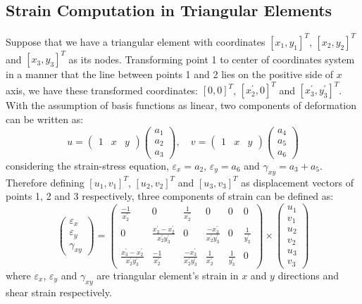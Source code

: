 \documentclass{jicspack}
\begin{document}
\subsection{Strain Computation in Triangular Elements}
Suppose that we have a triangular element with coordinates $[x_1, y_1]^T$, $[x_2, y_2]^T$ and $[x_3, y_3]^T$ as its nodes. Transforming point 1 to center of coordinates system in a manner that the line between points 1 and 2 lies on the positive side of $x$ axis, we have these transformed coordinates: $[0,0]^T$, $[x_2^{'}, 0]^T$ and $[x_3^{'}, y_3^{'}]^T$. With the assumption of basis functions as linear, two components of deformation can be written as:
\begin{equation}
u=\begin{pmatrix}
1 & x & y
\end{pmatrix} \begin{pmatrix}
a_1 \\ a_2 \\ a_3
\end{pmatrix}
, \quad
v=\begin{pmatrix}
1 & x & y
\end{pmatrix} \begin{pmatrix}
a_4 \\ a_5 \\ a_6
\end{pmatrix}
\end{equation} 
considering the strain-stress equation, $\varepsilon_x=a_2$, $\varepsilon_y=a_6$ and  $\gamma_{xy}=a_3+a_5$. Therefore defining $[u_1, v_1]^T$, $[u_2, v_2]^T$ and $[u_3, v_3]^T$  as displacement vectors of points 1, 2 and 3 respectively, three components of strain can be defined as: 
\begin{equation}
\begin{pmatrix}
\varepsilon_x \\ \varepsilon_y \\ \gamma_{xy}
\end{pmatrix} = \begin{pmatrix}
\frac{-1}{x_2^{'}} & 0 & \frac{1}{x_2^{'}} & 0 & 0 & 0 \\
0 & \frac{x_3^{'}-x_2^{'}}{x_2^{'}y_3^{'}} & 0 & \frac{-x_3^{'}}{x_2^{'}y_3^{'}} & 0 & \frac{1}{y_3^{'}} \\
\frac{x_3^{'}-x_2^{'}}{x_2^{'}y_3^{'}} & \frac{-1}{x_2^{'}} & \frac{-x_3^{'}}{x_2^{'}y_3^{'}} & \frac{1}{x_2^{'}} & \frac{1}{y_3^{'}} & 0
\end{pmatrix} \times \begin{pmatrix}
u_1 \\
v_1 \\
u_2 \\
v_2 \\
u_3 \\
v_3
\end{pmatrix}
\end{equation}
where $\varepsilon_x$, $\varepsilon_y$ and $\gamma_{xy}$  are triangular element's strain in $x$ and $y$ directions and shear strain respectively.
\end{document}
